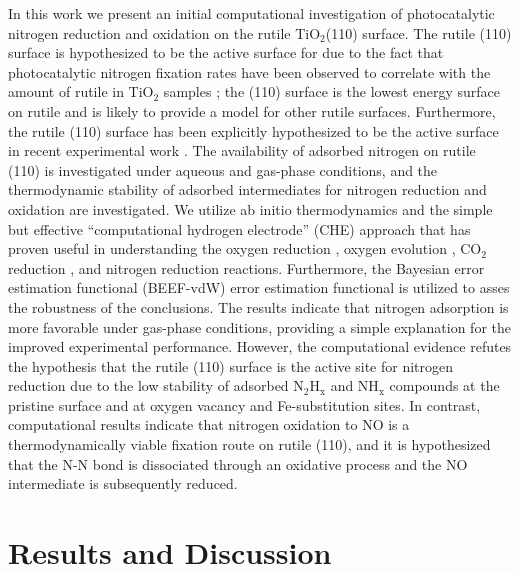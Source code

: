 \documentclass[journal=ascecg,manuscript=article,articletitle=true]{achemso}
\begin{document}
In this work we present an initial computational investigation of photocatalytic nitrogen reduction and oxidation on the rutile TiO$_2$(110) surface. The rutile (110) surface is hypothesized to be the active surface for due to the fact that photocatalytic nitrogen fixation rates have been observed to correlate with the amount of rutile in TiO$_2$ samples \cite{Schrauzer_2011}; the (110) surface is the lowest energy surface on rutile and is likely to provide a model for other rutile surfaces. Furthermore, the rutile (110) surface has been explicitly hypothesized to be the active surface in recent experimental work \cite{Hirakawa_2017}. The availability of adsorbed nitrogen on rutile (110) is investigated under aqueous and gas-phase conditions, and the thermodynamic stability of adsorbed intermediates for nitrogen reduction and oxidation are investigated. We utilize ab initio thermodynamics \cite{Reuter_2001,Reuter_2005} and the simple but effective ``computational hydrogen electrode'' (CHE) approach \cite{Calle_Vallejo_2012} that has proven useful in understanding the oxygen reduction \cite{Norskov_2004}, oxygen evolution \cite{Man_2011}, CO$_2$ reduction \cite{Peterson_2010}, and nitrogen reduction \cite{Skulason_2012} reactions. Furthermore, the Bayesian error estimation functional (BEEF-vdW) error estimation functional is utilized to asses the robustness of the conclusions. The results indicate that nitrogen adsorption is more favorable under gas-phase conditions, providing a simple explanation for the improved experimental performance. However, the computational evidence refutes the hypothesis that the rutile (110) surface is the active site for nitrogen reduction due to the low stability of adsorbed N$_2$H$_{\mathrm{x}}$ and NH$_{\mathrm{x}}$ compounds at the pristine surface and at oxygen vacancy and Fe-substitution sites. In contrast, computational results indicate that nitrogen oxidation to NO is a thermodynamically viable fixation route on rutile (110), and it is hypothesized that the N-N bond is dissociated through an oxidative process and the NO intermediate is subsequently reduced.

\section{Results and Discussion}
\end{document}
